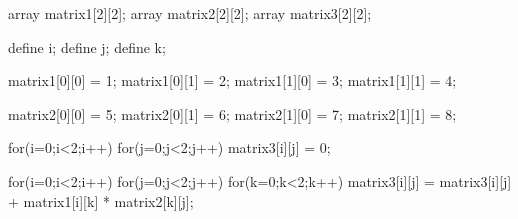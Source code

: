 array matrix1[2][2];
array matrix2[2][2];
array matrix3[2][2];

define i;
define j;
define k;

matrix1[0][0] = 1;
matrix1[0][1] = 2;
matrix1[1][0] = 3;
matrix1[1][1] = 4;

matrix2[0][0] = 5;
matrix2[0][1] = 6;
matrix2[1][0] = 7;
matrix2[1][1] = 8;

for(i=0;i<2;i++){
  for(j=0;j<2;j++){
    matrix3[i][j] = 0;
  }
}

for(i=0;i<2;i++){
  for(j=0;j<2;j++){
    for(k=0;k<2;k++){
      matrix3[i][j] = matrix3[i][j] + matrix1[i][k] * matrix2[k][j];
    }
  }
}
